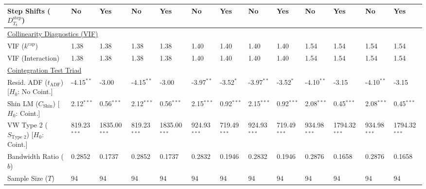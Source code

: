 \begin{table}[H]
\begin{tabular}{p{3.8cm}p{1.5cm}p{1.5cm}p{1.5cm}p{1.5cm}p{1.5cm}p{1.5cm}p{1.5cm}p{1.5cm}p{1.5cm}p{1.5cm}p{1.5cm}p{1.5cm}}
Step Shifts ($D^{\text{step}}_{T_b}$)  & No & Yes & No & Yes & No & Yes & No & Yes & No & Yes & No & Yes  \\
\midrule
\multicolumn{13}{l}{\underline{Collinearity Diagnostics (VIF)}} \\
VIF ($k^{\text{cap}}$) & 1.38 & 1.38 & 1.38 & 1.38 & 1.40 & 1.40 & 1.40 & 1.40 & 1.54 & 1.54 & 1.54 & 1.54  \\
VIF (Interaction) & 1.38 & 1.38 & 1.38 & 1.38 & 1.40 & 1.40 & 1.40 & 1.40 & 1.54 & 1.54 & 1.54 & 1.54  \\
\midrule
\multicolumn{13}{l}{\underline{Cointegration Test Triad}} \\
\makecell[l]{Resid. ADF ($t_{\text{ADF}}$) \\ {\scriptsize [$H_0$: No Coint.]}} & -4.15$^{**}$ & -3.00 & -4.15$^{**}$ & -3.00 & -3.97$^{**}$ & -3.52$^{*}$ & -3.97$^{**}$ & -3.52$^{*}$ & -4.10$^{**}$ & -3.15 & -4.10$^{**}$ & -3.15  \\
\makecell[l]{Shin LM ($C_{\text{Shin}}$) \\ {\scriptsize [$H_0$: Coint.]}} & 2.12$^{***}$ & 0.56$^{***}$ & 2.12$^{***}$ & 0.56$^{***}$ & 2.15$^{***}$ & 0.92$^{***}$ & 2.15$^{***}$ & 0.92$^{***}$ & 2.08$^{***}$ & 0.45$^{***}$ & 2.08$^{***}$ & 0.45$^{***}$  \\
\makecell[l]{VW Type 2 ($S_{\text{Type 2}}$) \\ {\scriptsize [$H_0$: Coint.]}} & 819.23$^{***}$ & 1835.00$^{***}$ & 819.23$^{***}$ & 1835.00$^{***}$ & 924.93$^{***}$ & 719.49$^{***}$ & 924.93$^{***}$ & 719.49$^{***}$ & 934.98$^{***}$ & 1794.32$^{***}$ & 934.98$^{***}$ & 1794.32$^{***}$  \\
\midrule
Bandwidth Ratio ($b$) & 0.2852 & 0.1737 & 0.2852 & 0.1737 & 0.2832 & 0.1946 & 0.2832 & 0.1946 & 0.2876 & 0.1658 & 0.2876 & 0.1658  \\
Sample Size ($T$) & 94 & 94 & 94 & 94 & 94 & 94 & 94 & 94 & 94 & 94 & 94 & 94  \\
\bottomrule

\end{tabular}
\end{table}

